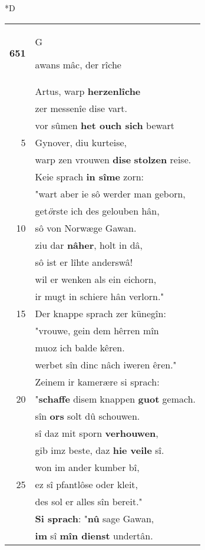 \documentclass[8pt,a4paper,notitlepage]{article}
\begin{document}
\begin{table}[ht]
\begin{minipage}[t]{0.5\linewidth}
\small
\begin{center}*D
\end{center}
\begin{tabular}{rl}
\textbf{651} & \begin{large}G\end{large}awans mâc, der rîche\\ 
 & Artus, warp \textbf{herzenlîche}\\ 
 & zer messenîe dise vart.\\ 
 & vor sûmen \textbf{het ouch sich} bewart\\ 
5 & Gynover, diu kurteise,\\ 
 & warp zen vrouwen \textbf{dise} \textbf{stolzen} reise.\\ 
 & Keie sprach \textbf{in sîme} zorn:\\ 
 & "wart aber ie sô werder man geborn,\\ 
 & get\textit{ö}rste ich des gelouben hân,\\ 
10 & sô von Norwæge Gawan.\\ 
 & ziu dar \textbf{nâher}, holt in dâ,\\ 
 & sô ist er lîhte anderswâ!\\ 
 & wil er wenken als ein eichorn,\\ 
 & ir mugt in schiere hân verlorn."\\ 
15 & Der knappe sprach zer künegîn:\\ 
 & "vrouwe, gein dem hêrren mîn\\ 
 & muoz ich balde kêren.\\ 
 & werbet sîn dinc nâch iweren êren."\\ 
 & Zeinem ir kamerære si sprach:\\ 
20 & "\textbf{schaffe} disem knappen \textbf{guot} gemach.\\ 
 & sîn \textbf{ors} solt dû schouwen.\\ 
 & sî daz mit sporn \textbf{verhouwen},\\ 
 & gib imz beste, daz \textbf{hie veile} sî.\\ 
 & won im ander kumber bî,\\ 
25 & ez sî pfantlôse oder kleit,\\ 
 & des sol er alles sîn bereit."\\ 
 & \textbf{Si sprach}: "\textbf{nû} sage Gawan,\\ 
 & \textbf{im} sî \textbf{mîn dienst} undertân.\\ 

\end{tabular}
\end{minipage}
\end{table}
\end{document}
